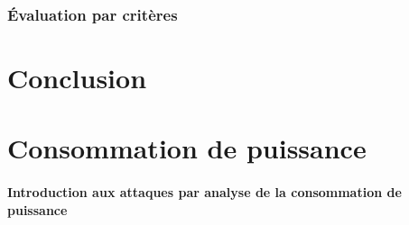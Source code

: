 \documentclass[oneside]{book}
\begin{document}
\subsection{Évaluation par critères}
\label{sec:Introduction}

\newpage


\chapter{Conclusion}

\newpage



















\chapter{Consommation de puissance}



\subsubsection{Introduction aux attaques par analyse de la consommation de puissance}
\label{subsec:CPAIntroduc}
\end{document}
